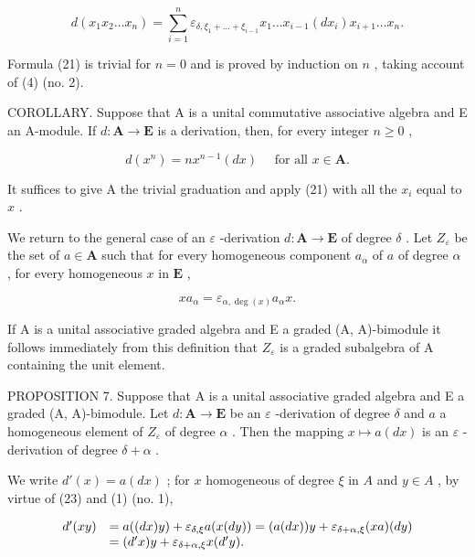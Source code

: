 \[
d \left(x _ {1} x _ {2} \dots x _ {n}\right) = \sum_ {i = 1} ^ {n} \varepsilon_ {\delta, \xi_ {1} + \dots + \xi_ {i - 1}} x _ {1} \dots x _ {i - 1} \left(d x _ {i}\right) x _ {i + 1} \dots x _ {n}.\tag{21}
\]

Formula (21) is trivial for \(n = 0\) and is proved by induction on \(n\) , taking account of (4) (no. 2).

COROLLARY. Suppose that A is a unital commutative associative algebra and E an A-module. If \(d: \mathbf{A} \to \mathbf{E}\) is a derivation, then, for every integer \(n \geqslant 0\) ,

\[
d (x ^ {n}) = n x ^ {n - 1} (d x) \quad \text { for all } x \in \mathbf {A}.\tag{22}
\]

It suffices to give A the trivial graduation and apply (21) with all the \(x_{i}\) equal to \(x\) .

We return to the general case of an \(\varepsilon\) -derivation \(d: \mathbf{A} \to \mathbf{E}\) of degree \(\delta\) . Let \(Z_{\varepsilon}\) be the set of \(a \in \mathbf{A}\) such that for every homogeneous component \(a_{\alpha}\) of \(a\) of degree \(\alpha\) , for every homogeneous \(x\) in \(\mathbf{E}\) ,

\[
x a _ {\alpha} = \varepsilon_ {\alpha , \deg (x)} a _ {\alpha} x.\tag{23}
\]

If A is a unital associative graded algebra and E a graded (A, A)-bimodule it follows immediately from this definition that \(Z_{\varepsilon}\) is a graded subalgebra of A containing the unit element.

PROPOSITION 7. Suppose that A is a unital associative graded algebra and E a graded (A, A)-bimodule. Let \(d: \mathbf{A} \to \mathbf{E}\) be an \(\varepsilon\) -derivation of degree \(\delta\) and \(a\) a homogeneous element of \(Z_{\varepsilon}\) of degree \(\alpha\) . Then the mapping \(x \mapsto a(dx)\) is an \(\varepsilon\) -derivation of degree \(\delta + \alpha\) .

We write \(d'(x) = a(dx)\) ; for \(x\) homogeneous of degree \(\xi\) in \(A\) and \(y \in A\) , by virtue of (23) and (1) (no. 1),

\[
\begin{array}{r l} d ^ {\prime} (x y) & = a ((d x) y) + \varepsilon_ {\delta , \xi} a (x (d y)) = (a (d x)) y + \varepsilon_ {\delta + \alpha , \xi} (x a) (d y) \\ & = (d ^ {\prime} x) y + \varepsilon_ {\delta + \alpha , \xi} x (d ^ {\prime} y). \end{array}
\]


